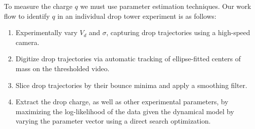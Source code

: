 \documentclass[12pt,a4paper,oneside]{book}
\begin{document}
To measure the charge $q$ we must use parameter estimation techniques. Our work flow to identify $q$ in an individual drop tower experiment is as follows:
\begin{enumerate}
\item Experimentally vary $V_d$ and $\sigma$, capturing drop trajectories using a high-speed camera.
\item Digitize drop trajectories via automatic tracking of ellipse-fitted centers of mass on the thresholded video.
\item Slice drop trajectories by their bounce minima and apply a smoothing filter.
\item Extract the drop charge, as well as other experimental parameters, by maximizing the log-likelihood of the data given the dynamical model by varying the parameter vector using a direct search optimization. 
\end{enumerate}
\end{document}
